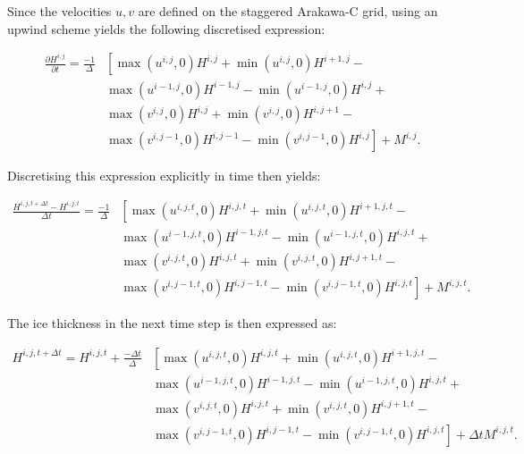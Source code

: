 \documentclass{article}
\begin{document}
Since the velocities $u,v$ are defined on the staggered Arakawa-C grid, using an upwind scheme yields the following discretised expression:

\begin{equation} \label{eq:thickness_03}
\begin{split}
\frac{\partial H^{i,j}}{\partial t} = \frac{-1}{\Delta} & \left[ 
\max \left( u^{i,j},0 \right) H^{i,j} + \min \left( u^{i,j},0 \right) H^{i+1,j} \right. - \\
& \left. \max \left( u^{i-1,j},0 \right) H^{i-1,j} - \min \left( u^{i-1,j},0 \right) H^{i,j} \right. + \\
& \left. \max \left( v^{i,j},0 \right) H^{i,j} + \min \left( v^{i,j},0 \right) H^{i,j+1} \right. - \\
& \left. \max \left( v^{i,j-1},0 \right) H^{i,j-1} - \min \left( v^{i,j-1},0 \right) H^{i,j} \right]
+ M^{i,j}.
\end{split}
\end{equation}

Discretising this expression explicitly in time then yields:

\begin{equation} \label{eq:thickness_04}
\begin{split}
\frac{H^{i,j,t+\Delta t} - H^{i,j,t}}{\Delta t} = \frac{-1}{\Delta} & \left[ 
\max \left( u^{i,j,t},0 \right) H^{i,j,t} + \min \left( u^{i,j,t},0 \right) H^{i+1,j,t} \right. - \\
& \left. \max \left( u^{i-1,j,t},0 \right) H^{i-1,j,t} - \min \left( u^{i-1,j,t},0 \right) H^{i,j,t} \right. + \\
& \left. \max \left( v^{i,j,t},0 \right) H^{i,j,t} + \min \left( v^{i,j,t},0 \right) H^{i,j+1,t} \right. - \\
& \left. \max \left( v^{i,j-1,t},0 \right) H^{i,j-1,t} - \min \left( v^{i,j-1,t},0 \right) H^{i,j,t} \right]
+ M^{i,j,t}.
\end{split}
\end{equation}

The ice thickness in the next time step is then expressed as:

\begin{equation} \label{eq:thickness_05}
\begin{split}
H^{i,j,t+\Delta t} = H^{i,j,t} + \frac{-\Delta t}{\Delta} & \left[ 
\max \left( u^{i,j,t},0 \right) H^{i,j,t} + \min \left( u^{i,j,t},0 \right) H^{i+1,j,t} \right. - \\
& \left. \max \left( u^{i-1,j,t},0 \right) H^{i-1,j,t} - \min \left( u^{i-1,j,t},0 \right) H^{i,j,t} \right. + \\
& \left. \max \left( v^{i,j,t},0 \right) H^{i,j,t} + \min \left( v^{i,j,t},0 \right) H^{i,j+1,t} \right. - \\
& \left. \max \left( v^{i,j-1,t},0 \right) H^{i,j-1,t} - \min \left( v^{i,j-1,t},0 \right) H^{i,j,t} \right]
+ \Delta t M^{i,j,t}.
\end{split}
\end{equation}
\end{document}
